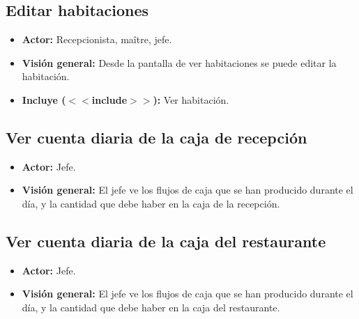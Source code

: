 \documentclass[spanish,a4paper,11pt, twoside]{report}	%
\begin{document}
	\subsection{Editar habitaciones}
		\begin{itemize}
			\item \textbf{Actor:} Recepcionista, maître, jefe.
			\item \textbf{Visión general:} Desde la pantalla de ver habitaciones se puede editar la habitación.	
			\item \textbf{Incluye ($<<$include$>>$):} Ver habitación.
		\end {itemize}

	
	\hspace{-2 true cm}
	\subsection{Ver cuenta diaria de la caja de recepción}
		\begin{itemize}
			\item \textbf{Actor:} Jefe.
			\item \textbf{Visión general:} El jefe ve los flujos de caja que se han producido durante el día, 
				y la cantidad que debe haber en la caja de la recepción.	
		\end {itemize}


	\subsection{Ver cuenta diaria de la caja del restaurante}
		\begin{itemize}
			\item \textbf{Actor:} Jefe.
			\item \textbf{Visión general:} El jefe ve los flujos de caja que se han producido durante el día, 
				y la cantidad que debe haber en la caja del restaurante.	
		\end {itemize}
\end{document}
